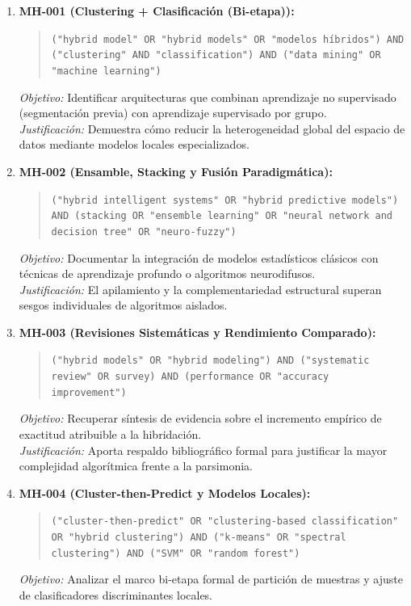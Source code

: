 \begin{enumerate}
  \item \textbf{MH-001 (Clustering + Clasificación (Bi-etapa)):}
  \begin{quote}
  \texttt{("hybrid model" OR "hybrid models" OR "modelos híbridos") AND ("clustering" AND "classification") AND ("data mining" OR "machine learning")}
  \end{quote}
  \textit{Objetivo:} Identificar arquitecturas que combinan aprendizaje no supervisado (segmentación previa) con aprendizaje supervisado por grupo.\\
  \textit{Justificación:} Demuestra cómo reducir la heterogeneidad global del espacio de datos mediante modelos locales especializados.
  \item \textbf{MH-002 (Ensamble, Stacking y Fusión Paradigmática):}
  \begin{quote}
  \texttt{("hybrid intelligent systems" OR "hybrid predictive models") AND (stacking OR "ensemble learning" OR "neural network and decision tree" OR "neuro-fuzzy")}
  \end{quote}
  \textit{Objetivo:} Documentar la integración de modelos estadísticos clásicos con técnicas de aprendizaje profundo o algoritmos neurodifusos.\\
  \textit{Justificación:} El apilamiento y la complementariedad estructural superan sesgos individuales de algoritmos aislados.
  \item \textbf{MH-003 (Revisiones Sistemáticas y Rendimiento Comparado):}
  \begin{quote}
  \texttt{("hybrid models" OR "hybrid modeling") AND ("systematic review" OR survey) AND (performance OR "accuracy improvement")}
  \end{quote}
  \textit{Objetivo:} Recuperar síntesis de evidencia sobre el incremento empírico de exactitud atribuible a la hibridación.\\
  \textit{Justificación:} Aporta respaldo bibliográfico formal para justificar la mayor complejidad algorítmica frente a la parsimonia.
  \item \textbf{MH-004 (Cluster-then-Predict y Modelos Locales):}
  \begin{quote}
  \texttt{("cluster-then-predict" OR "clustering-based classification" OR "hybrid clustering") AND ("k-means" OR "spectral clustering") AND ("SVM" OR "random forest")}
  \end{quote}
  \textit{Objetivo:} Analizar el marco bi-etapa formal de partición de muestras y ajuste de clasificadores discriminantes locales.\\

\end{enumerate}
